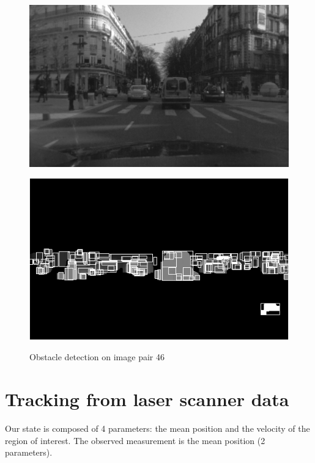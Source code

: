 \documentclass[a4paper,11pt]{article}
\begin{document}
\begin{figure}[H]
\centering
\begin{minipage}{0.45\linewidth}
\centering
\includegraphics[scale=0.3]{pic/left_46.png}
\label{clustering-alt2:a}
\end{minipage}
\begin{minipage}{0.45\linewidth}
\centering
\includegraphics[scale=0.3]{pic/clustering-alt2.png}
\label{clustering-alt2:b}
\end{minipage}
\caption{Obstacle detection on image pair 46}
\label{clustering-alt2}
\end{figure}


\newpage
\section{Tracking from laser scanner data}
Our state is composed of 4 parameters: the mean position and the velocity of
the region of interest. The observed measurement is the mean position (2
parameters).
\end{document}
